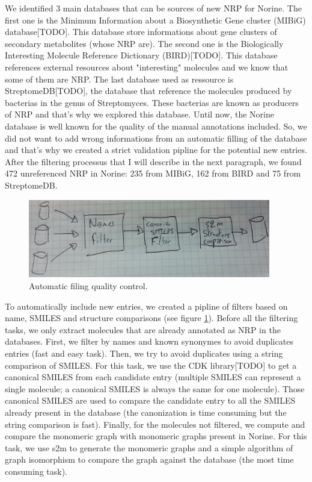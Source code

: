 \documentclass[long, final]{jobim2017}
\begin{document}
We identified 3 main databases that can be sources of new NRP for Norine.
The first one is the Minimum Information about a Biosynthetic Gene cluster (MIBiG) database[TODO].
This database store informations about gene clusters of secondary metabolites (whose NRP are).
The second one is the Biologically Interesting Molecule Reference Dictionary (BIRD)[TODO].
This database references external resources about "interesting" molecules and we know that some of them are NRP.
The last database used as ressource is StreptomeDB[TODO], the database that reference the molecules produced by bacterias in the genus of Streptomyces.
These bacterias are known as producers of NRP and that's why we explored this database.
Until now, the Norine database is well known for the quality of the manual annotations included.
So, we did not want to add wrong informations from an automatic filling of the database and that's why we created a strict validation pipline for the potential new entries.
After the filtering processus that I will describe in the next paragraph, we found 472 unreferenced NRP in Norine: 235 from MIBiG, 162 from BIRD and 75 from StreptomeDB.

 \begin{figure}
   \begin{center}
     \includegraphics[width=400px]{figs/filters.jpg}
   \end{center}
   \caption{Automatic filing quality control.}
   \label{fig:quality}
 \end{figure}

To automatically include new entries, we created a pipline of filters based on name, SMILES and structure comparisons (see figure \ref{fig:quality}).
Before all the filtering tasks, we only extract molecules that are already annotated as NRP in the databases.
First, we filter by names and known synonymes to avoid duplicates entries (fast and easy task).
Then, we try to avoid duplicates using a string comparison of SMILES.
For this task, we use the CDK library[TODO] to get a canonical SMILES from each candidate entry (multiple SMILES can represent a single molecule; a canonical SMILES is always the same for one molecule).
Those canonical SMILES are used to compare the candidate entry to all the SMILES already present in the database (the canonization is time consuming but the string comparison is fast).
Finally, for the molecules not filtered, we compute and compare the monomeric graph with monomeric graphs present in Norine.
For this task, we use s2m to generate the monomeric graphs and a simple algorithm of graph isomorphism to compare the graph against the database (the most time consuming task).
\end{document}

